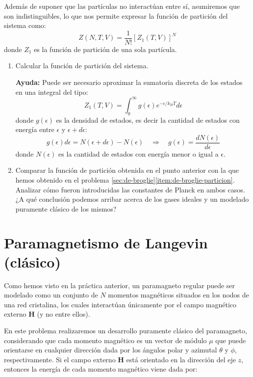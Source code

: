 \documentclass[a4paper,11pt]{article}
\begin{document}
Además de suponer que las partículas no interactúan entre sí,
asumiremos que son indistinguibles, lo que nos permite expresar la
función de partición del sistema como:
$$ Z(N,T,V) = \frac{1}{N!} [Z_1(T, V)]^N $$
donde $Z_1$ es la función de partición de una sola partícula.


\begin{enumerate}[label=(\alph*),
                  leftmargin=2\parindent,
                  rightmargin=2\parindent]

    \item{Calcular la función de partición del sistema.}

    {\small
    \textbf{Ayuda:} Puede ser necesario aproximar la sumatoria
    discreta de los estados en una integral del tipo:
    $$ Z_1(T, V) =
    \int_0^\infty g(\epsilon) e^{-\epsilon/k_B T} d\epsilon $$
    donde $g(\epsilon)$ es la densidad de estados, es decir la cantidad de
    estados con energía entre $\epsilon$ y $\epsilon + d\epsilon$:
    $$ g(\epsilon) d\epsilon = N(\epsilon + d\epsilon) - N(\epsilon)
    \quad \Rightarrow \quad g(\epsilon) = \frac{d N(\epsilon)}{d\epsilon} $$
    donde $N(\epsilon)$ es la cantidad de estados con energía menor o
    igual a $\epsilon$.
    }

    \item{Comparar la función de partición obtenida en el punto
          anterior con la que hemos obtenido en el problema
          \ref{sec:de-broglie}\ref{item:de-broglie-particion}.
          Analizar cómo fueron introducidas las constantes de Planck
          en ambos casos. ¿A qué conclusión podemos arribar acerca
          de los gases ideales y un modelado puramente clásico de los
          mismos?
          }

\end{enumerate}


\section{Paramagnetismo de Langevin (clásico)}
\label{sec:paramagnetismo-langevin}

Como hemos visto en la práctica anterior, un paramagneto regular puede ser
modelado como un conjunto de $N$ momentos magnéticos situados en los
nodos de una red cristalina, los cuales interactúan únicamente por el campo
magnético externo $\textbf{H}$ (y no entre ellos).

En este problema realizaremos un desarrollo puramente clásico del
paramagneto, considerando que cada momento magnético es un vector de
módulo $\mu$ que puede orientarse en cualquier dirección dada por los
ángulos polar y azimutal $\theta$ y $\phi$, respectivamente.
Si el campo externo $\textbf{H}$ está orientado en la dirección del eje
$z$, entonces la energía de cada momento magnético viene dada por:
\end{document}
